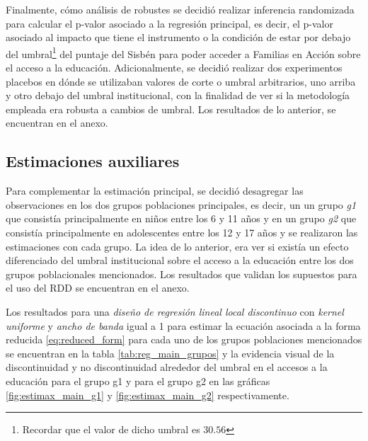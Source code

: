 \documentclass[AER]{AEA}
\begin{document}
Finalmente, cómo análisis de robustes se decidió realizar inferencia randomizada para calcular el p-valor asociado a la regresión principal, es decir, el p-valor asociado al impacto que tiene el instrumento o la condición de estar por debajo del umbral\footnote{Recordar que el valor de dicho umbral es $30.56$} del puntaje del Sisbén para poder acceder a Familias en Acción sobre el acceso a la educación. Adicionalmente, se decidió realizar dos experimentos placebos en dónde se utilizaban valores de corte o umbral arbitrarios, uno arriba y otro debajo del umbral institucional, con la finalidad de ver si la metodología empleada era robusta a cambios de umbral. Los resultados de lo anterior, se encuentran en el anexo. 

\subsection{Estimaciones auxiliares}

Para complementar la estimación principal, se decidió desagregar las observaciones en los dos grupos poblaciones principales, es decir, un un grupo \textit{g1} que consistía principalmente en niños entre los 6 y 11 años y en un grupo \textit{g2} que consistía principalmente en adolescentes entre los 12 y 17 años y se realizaron las estimaciones con cada grupo. La idea de lo anterior, era ver si existía un efecto diferenciado del umbral institucional sobre el acceso a la educación entre los dos grupos poblacionales mencionados. Los resultados que validan los supuestos para el uso del RDD se encuentran en el anexo. 

Los resultados para una \textit{diseño de regresión lineal local discontinuo} con \textit{kernel uniforme} y \textit{ancho de banda} igual a 1 para estimar la ecuación asociada a la forma reducida \ref{eq:reduced_form} para cada uno de los grupos poblaciones mencionados se encuentran en la tabla \ref{tab:reg_main_grupos} y la evidencia visual de la discontinuidad y no discontinuidad alrededor del umbral en el accesos a la educación para el grupo g1 y para el grupo g2 en las gráficas \ref{fig:estimax_main_g1} y \ref{fig:estimax_main_g2} respectivamente.
\end{document}
